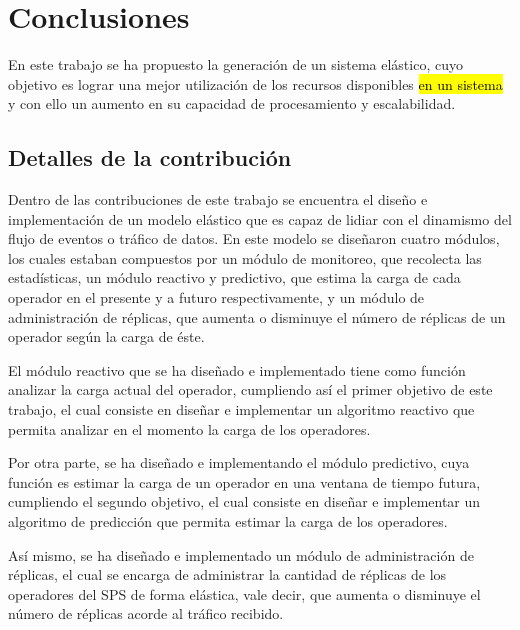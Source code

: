 \chapter{Conclusiones}
\label{cap:conclusiones}
En este trabajo se ha propuesto la generación de un sistema elástico, cuyo objetivo es lograr una mejor utilización de los recursos disponibles \hl{en un sistema} y con ello un aumento en su capacidad de procesamiento y escalabilidad.

\section{Detalles de la contribución}
Dentro de las contribuciones de este trabajo se encuentra el diseño e implementación de un modelo elástico que es capaz de lidiar con el dinamismo del flujo de eventos o tráfico de datos. En este modelo se diseñaron cuatro módulos, los cuales estaban compuestos por un módulo de monitoreo, que recolecta las estadísticas, un módulo reactivo y predictivo, que estima la carga de cada operador en el presente y a futuro respectivamente, y un módulo de administración de réplicas, que aumenta o disminuye el número de réplicas de un operador según la carga de éste.

El módulo reactivo que se ha diseñado e implementado tiene como función analizar la carga actual del operador, cumpliendo así el primer objetivo de este trabajo, el cual consiste en dise\~nar e implementar un algoritmo reactivo que permita analizar en el momento la carga de los operadores.

Por otra parte, se ha diseñado e implementando el módulo predictivo, cuya función es estimar la carga de un operador en una ventana de tiempo futura, cumpliendo el segundo objetivo, el cual consiste en dise\~nar e implementar un algoritmo de predicci\'on que permita estimar la carga de los operadores.

Así mismo, se ha diseñado e implementado un módulo de administración de réplicas, el cual se encarga de administrar la cantidad de réplicas de los operadores del SPS de forma elástica, vale decir, que aumenta o disminuye el número de réplicas acorde al tráfico recibido.


